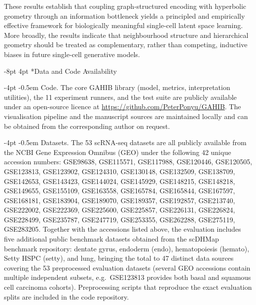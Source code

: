 \documentclass[preprint,12pt]{elsarticle}
\makeatletter
\renewcommand\section{\@startsection{section}{1}{\z@}%
  {-8pt \@plus -2pt \@minus -2pt}%
  {4pt \@plus 1pt \@minus 1pt}%
  {\normalfont\Large\bfseries}}
\renewcommand\paragraph{\@startsection{paragraph}{4}{\z@}%
  {-4pt \@plus -1pt \@minus -1pt}%
  {-0.5em}%
  {\normalfont\normalsize\bfseries}}
\makeatother
\begin{document}
These results establish that coupling graph-structured encoding with
hyperbolic geometry through an information bottleneck yields a principled
and empirically effective framework for biologically meaningful single-cell
latent space learning. More broadly, the results indicate that neighbourhood
structure and hierarchical geometry should be treated as complementary,
rather than competing, inductive biases in future single-cell generative
models.


\section*{Data and Code Availability}

\paragraph{Code.}
The core GAHIB library (model, metrics, interpretation utilities),
the 11 experiment runners, and the test suite are publicly available
under an open-source licence at
\url{https://github.com/PeterPonyu/GAHIB}. The visualisation pipeline
and the manuscript sources are maintained locally and can be obtained
from the corresponding author on request.

\paragraph{Datasets.}
The 53 scRNA-seq datasets are all publicly available from the NCBI
Gene Expression Omnibus (GEO) under the following 42 unique
accession numbers:
GSE98638, GSE115571, GSE117988, GSE120446, GSE120505, GSE123813,
GSE123902, GSE124310, GSE130148, GSE132509, GSE138709, GSE142653,
GSE143423, GSE144024, GSE145929, GSE148215, GSE148218, GSE149655,
GSE155109, GSE163558, GSE165784, GSE165844, GSE167597, GSE168181,
GSE183904, GSE189070, GSE189357, GSE192857, GSE213740, GSE222002,
GSE222369, GSE225600, GSE225857, GSE226131, GSE226824, GSE228499,
GSE235787, GSE247719, GSE253355, GSE262288, GSE275119, GSE283205.
Together with the accessions listed above, the evaluation includes
five additional public benchmark datasets obtained from the
scDHMap benchmark repository: dentate gyrus, endoderm (endo),
hematopoiesis (hemato), Setty HSPC (setty), and lung, bringing the
total to 47 distinct data sources covering the 53 preprocessed
evaluation datasets (several GEO accessions contain multiple
independent subsets, e.g.\ GSE123813 provides both basal and
squamous cell carcinoma cohorts).
Preprocessing scripts that reproduce the exact evaluation splits are
included in the code repository.
\end{document}
